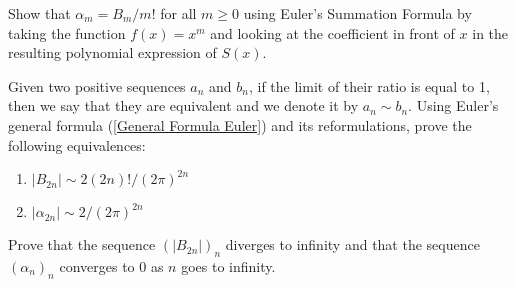 \begin{exercise} \label{ex: alpha_n = B_n/n!}
    Show that $\alpha_m = B_m / m!$ for all $m \geq 0$ using Euler's Summation Formula by taking the function $f(x) = x^m$ and looking at the coefficient in front of $x$ in the resulting polynomial expression of $S(x)$. 
\end{exercise}

\begin{exercise} \label{ex: Bernoulli Asymptotic}
    Given two positive sequences $a_n$ and $b_n$, if the limit of their ratio is equal to 1, then we say that they are equivalent and we denote it by $a_n \sim b_n$. Using Euler's general formula (\ref{General Formula Euler}) and its reformulations, prove the following equivalences:
    \begin{enumerate}[label=(\alph*)]
        \item $|B_{2n}| \sim 2(2n)! / (2\pi)^{2n}$
        \item $|\alpha_{2n}| \sim 2 / (2\pi)^{2n}$
    \end{enumerate}
\end{exercise}

\begin{exercise} \label{ex: Bernoulli Limits}
    Prove that the sequence $(|B_{2n}|)_n$ diverges to infinity and that the sequence $(\alpha_n)_n$ converges to 0 as $n$ goes to infinity.
\end{exercise}
